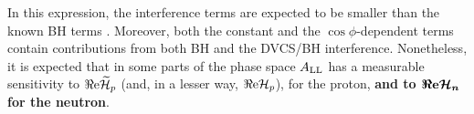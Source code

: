 In this expression, the interference terms are expected to be smaller than the known BH terms \cite{belitski}. Moreover, both the constant and the $\cos\phi$-dependent terms contain contributions from both BH and the DVCS/BH interference. Nonetheless, it is expected that in some parts of the phase space $A_{\rm LL}$ has a measurable sensitivity to $\Re{\rm e} \widetilde{\cal H}_p$ (and, in a lesser way, $\Re{\rm e}{\cal H}_p$), for the proton, {\bf and to $\boldsymbol{\Re{\rm e}{\cal H}_n}$ for the neutron}.
